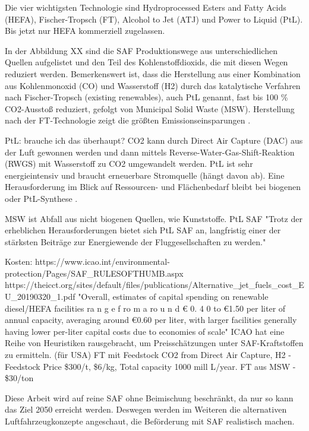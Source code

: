 Die vier wichtigsten Technologie sind Hydroprocessed Esters and Fatty Acids (HEFA), Fischer-Tropsch (FT), Alcohol to Jet (ATJ) 
und Power to Liquid (PtL). Bis jetzt nur HEFA kommerziell zugelassen.

In der Abbildung XX sind die SAF Produktionswege aus unterschiedlichen Quellen aufgelistet und den Teil des Kohlenstoffdioxids,
die mit diesen Wegen reduziert werden. Bemerkenswert ist, dass die Herstellung
aus einer Kombination aus Kohlenmonoxid (CO) und Wasserstoff (H2) durch das katalytische Verfahren nach Fischer-Tropsch (existing renewables), 
auch PtL genannt, fast bis 100 \% CO2-Ausstoß reduziert, gefolgt von Municipal Solid Waste (MSW). 
Herstellung nach der FT-Technologie zeigt die größten Emissionseinsparungen \cite{iata_saf_2024, de2017life}.

PtL: brauche ich das überhaupt?
CO2 kann durch Direct Air Capture (DAC) aus der Luft gewonnen werden und dann mittels 
Reverse-Water-Gas-Shift-Reaktion (RWGS) mit Wasserstoff zu CO2 umgewandelt werden. 
PtL ist sehr energieintensiv und braucht erneuerbare Stromquelle (hängt davon ab).
\cite{ansell2023review}
Eine Herausforderung im Blick auf Ressourcen- und Flächenbedarf bleibt bei biogenen oder PtL-Synthese \cite{ansell2023review}.

MSW ist Abfall aus nicht biogenen Quellen, wie Kunststoffe. \cite{icao_saf_conversion_2024} PtL SAF "Trotz der erheblichen Herausforderungen 
bietet sich PtL SAF an, langfristig einer der stärksten Beiträge zur Energiewende der Fluggesellschaften zu werden."

Kosten:
https://www.icao.int/environmental-protection/Pages/SAF_RULESOFTHUMB.aspx
https://theicct.org/sites/default/files/publications/Alternative_jet_fuels_cost_EU_20190320_1.pdf
"Overall, estimates of capital spending
on renewable diesel/HEFA facilities
ra n g e f ro m a ro u n d € 0. 4 0 to
€1.50 per liter of annual capacity,
averaging around €0.60 per liter,
with larger facilities generally having
lower per-liter capital costs due to
economies of scale"
ICAO hat eine Reihe von Heuristiken rausgebracht, um Preisschätzungen unter SAF-Kraftstoffen zu ermitteln. (für USA)
FT mit Feedstock CO2 from Direct Air Capture, H2 - Feedstock Price \$300/t, \$6/kg, Total capacity 1000 mill L/year.
FT aus MSW - \$30/ton 

Diese Arbeit wird auf reine SAF ohne Beimischung beschränkt, da nur so kann das Ziel 2050 erreicht werden. 
Deswegen werden im Weiteren die alternativen Luftfahrzeugkonzepte angeschaut, die Beförderung mit SAF realistisch machen.


